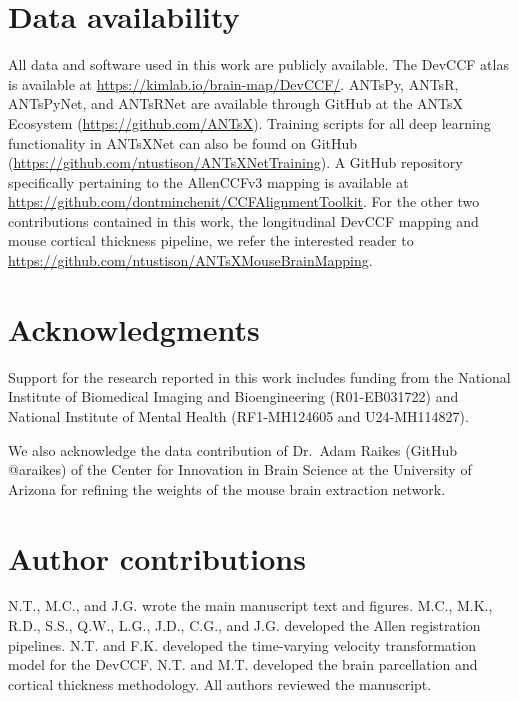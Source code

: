 \documentclass[
  12pt,
]{article}
\begin{document}
\clearpage

\section*{Data availability}\label{data-availability}

All data and software used in this work are publicly available. The
DevCCF atlas is available at \url{https://kimlab.io/brain-map/DevCCF/}.
ANTsPy, ANTsR, ANTsPyNet, and ANTsRNet are available through GitHub at
the ANTsX Ecosystem (\url{https://github.com/ANTsX}). Training scripts
for all deep learning functionality in ANTsXNet can also be found on
GitHub (\url{https://github.com/ntustison/ANTsXNetTraining}). A GitHub
repository specifically pertaining to the AllenCCFv3 mapping is
available at \url{https://github.com/dontminchenit/CCFAlignmentToolkit}.
For the other two contributions contained in this work, the longitudinal
DevCCF mapping and mouse cortical thickness pipeline, we refer the
interested reader to
\url{https://github.com/ntustison/ANTsXMouseBrainMapping}.

\clearpage

\section*{Acknowledgments}\label{acknowledgments}

Support for the research reported in this work includes funding from the
National Institute of Biomedical Imaging and Bioengineering
(R01-EB031722) and National Institute of Mental Health (RF1-MH124605 and
U24-MH114827).

We also acknowledge the data contribution of Dr.~Adam Raikes (GitHub
@araikes) of the Center for Innovation in Brain Science at the
University of Arizona for refining the weights of the mouse brain
extraction network.

\clearpage

\section*{Author contributions}\label{author-contributions}

N.T., M.C., and J.G. wrote the main manuscript text and figures. M.C.,
M.K., R.D., S.S., Q.W., L.G., J.D., C.G., and J.G. developed the Allen
registration pipelines. N.T. and F.K. developed the time-varying
velocity transformation model for the DevCCF. N.T. and M.T. developed
the brain parcellation and cortical thickness methodology. All authors
reviewed the manuscript. \clearpage
\end{document}
